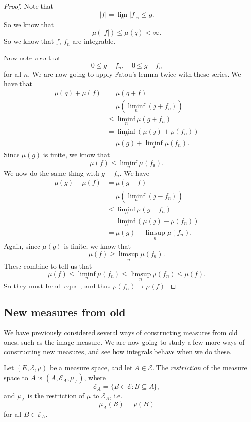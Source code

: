 \documentclass[a4paper]{article}
\begin{document}
\begin{proof}
  Note that
  \[
    |f| = \lim_n |f|_n \leq g.
  \]
  So we know that
  \[
    \mu(|f|) \leq \mu(g) < \infty.
  \]
  So we know that $f$, $f_n$ are integrable.

  Now note also that
  \[
    0 \leq g + f_n,\quad 0 \leq g - f_n
  \]
  for all $n$. We are now going to apply Fatou's lemma twice with these series. We have that
  \begin{align*}
    \mu(g) + \mu(f) &= \mu(g + f) \\
    &= \mu\left(\liminf_n (g + f_n)\right) \\
    &\leq \liminf_n \mu(g + f_n)\\
    &= \liminf_n (\mu(g) + \mu(f_n))\\
    &= \mu(g) + \liminf_n \mu(f_n).
  \end{align*}
  Since $\mu(g)$ is finite, we know that
  \[
    \mu(f) \leq \liminf_n \mu(f_n).
  \]
  We now do the same thing with $g - f_n$. We have
  \begin{align*}
    \mu(g) - \mu(f) &= \mu(g - f) \\
    &= \mu\left(\liminf_n (g - f_n)\right) \\
    &\leq \liminf_n \mu(g - f_n)\\
    &= \liminf_n (\mu(g) - \mu(f_n))\\
    &= \mu(g) - \limsup_n \mu(f_n).
  \end{align*}
  Again, since $\mu(g)$ is finite, we know that
  \[
    \mu(f) \geq \limsup_n \mu(f_n).
  \]
  These combine to tell us that
  \[
    \mu(f) \leq \liminf_n \mu(f_n) \leq \limsup_n \mu(f_n) \leq \mu(f).
  \]
  So they must be all equal, and thus $\mu(f_n) \to \mu(f)$.
\end{proof}

\subsection{New measures from old}
We have previously considered several ways of constructing measures from old ones, such as the image measure. We are now going to study a few more ways of constructing new measures, and see how integrals behave when we do these.

\begin{defi}
  Let $(E, \mathcal{E}, \mu)$ be a measure space, and let $A \in \mathcal{E}$. The \emph{restriction} of the measure space to $A$ is $(A, \mathcal{E}_A, \mu_A)$, where
  \[
    \mathcal{E}_A = \{B \in \mathcal{E}: B \subseteq A\},
  \]
  and $\mu_A$ is the restriction of $\mu$ to $\mathcal{E}_A$, i.e.
  \[
    \mu_A(B) = \mu(B)
  \]
  for all $B \in \mathcal{E}_A$.
\end{defi}
\end{document}
